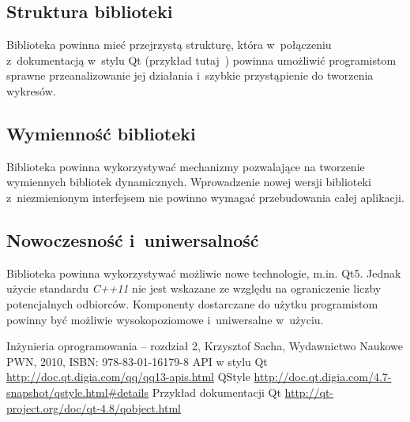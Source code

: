 \documentclass[11pt,twoside,a4paper,final]{llncs}
\begin{document}
\subsection{Struktura biblioteki}
Biblioteka powinna mieć przejrzystą strukturę, która w~połączeniu z~dokumentacją w~stylu Qt (przykład tutaj~\cite{qt-doc}) powinna umożliwić programistom sprawne przeanalizowanie jej działania i~szybkie przystąpienie do tworzenia wykresów.

\subsection{Wymienność biblioteki}
Biblioteka powinna wykorzystywać mechanizmy pozwalające na tworzenie wymiennych bibliotek dynamicznych. Wprowadzenie nowej wersji biblioteki z~niezmienionym interfejsem nie powinno wymagać przebudowania całej aplikacji.

\subsection{Nowoczesność i~uniwersalność}
Biblioteka powinna wykorzystywać możliwie nowe technologie, m.in. Qt5. Jednak użycie standardu \textit{C++11} nie jest wskazane ze względu na ograniczenie liczby potencjalnych odbiorców. Komponenty dostarczane do użytku programistom powinny być możliwie wysokopoziomowe i~uniwersalne w~użyciu.




\begin{thebibliography}{}
Inżynieria oprogramowania -- rozdział 2, Krzysztof Sacha, Wydawnictwo Naukowe PWN, 2010, ISBN: 978-83-01-16179-8
API w stylu Qt \url{http://doc.qt.digia.com/qq/qq13-apis.html}
QStyle \url{http://doc.qt.digia.com/4.7-snapshot/qstyle.html#details}
Przykład dokumentacji Qt \url{http://qt-project.org/doc/qt-4.8/qobject.html}

\end{thebibliography}
\end{document}

